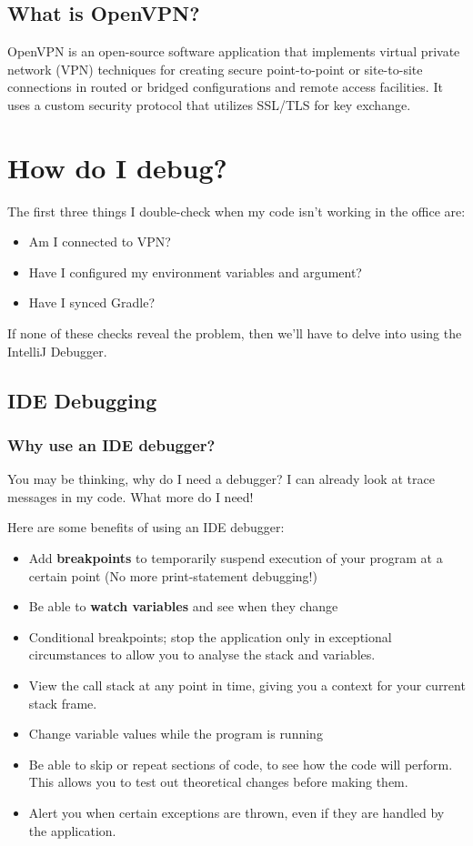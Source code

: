\documentclass[oneside]{book}
\begin{document}
\section{What is OpenVPN?}
OpenVPN is an open-source software application that implements virtual private network (VPN) techniques for creating secure point-to-point or site-to-site connections in routed or bridged configurations and remote access facilities. It uses a custom security protocol that utilizes SSL/TLS for key exchange.
\chapter{How do I debug?}
The first three things I double-check when my code isn't working in the office are:
\begin{itemize}
	\item Am I connected to VPN?
	\item Have I configured my environment variables and argument?
	\item Have I synced Gradle?
\end{itemize}
If none of these checks reveal the problem, then we'll have to delve into using the IntelliJ Debugger.
\section{IDE Debugging}
\subsection{Why use an IDE debugger?}
You may be thinking, why do I need a debugger? I can already look at trace messages in my code. What more do I need!\par
Here are some benefits of using an IDE debugger:
\begin{itemize}
	\item Add \textbf{breakpoints} to temporarily suspend execution of your program at a certain point (No more print-statement debugging!)
	\item Be able to  \textbf{watch variables} and see when they change
	\item Conditional breakpoints; stop the application only in exceptional circumstances to allow you to analyse the stack and variables.
	\item View the call stack at any point in time, giving you a context for your current stack frame.
	\item Change variable values while the program is running
	\item Be able to skip or repeat sections of code, to see how the code will perform. This allows you to test out theoretical changes before making them.
	\item Alert you when certain exceptions are thrown, even if they are handled by the application.
\end{itemize}
\end{document}
